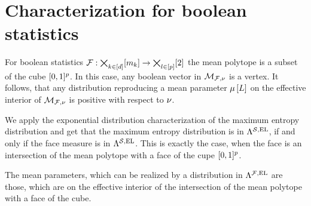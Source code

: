 \documentclass[aps,onecolumn,nofootinbib,pra]{article}
\begin{document}
    \section{Characterization for boolean statistics}

    For boolean statistics $\mathcal{F}:\bigtimes_{k\in[d]}[m_{k}]\rightarrow\bigtimes_{l\in[p]}[2]$ the mean polytope is a subset of the cube $[0,1]^p$.
    In this case, any boolean vector in $\mathcal{M}_{\mathcal{F},\nu}$ is a vertex.
    It follows, that any distribution reproducing a mean parameter $\mu\left[L\right]$ on the effective interior of $\mathcal{M}_{\mathcal{F},\nu}$ is positive with respect to $\nu$.

    We apply the exponential distribution characterization of the maximum entropy distribution and get that the maximum entropy distribution is in $\Lambda^{\mathcal{S},\mathrm{EL}}$, if and only if the face measure is in $\Lambda^{\mathcal{S},\mathrm{EL}}$.
    This is exactly the case, when the face is an intersection of the mean polytope with a face of the cupe $[0,1]^p$.

    The mean parameters, which can be realized by a distribution in $\Lambda^{\mathcal{F},\mathrm{EL}}$ are those, which are on the effective interior of the intersection of the mean polytope with a face of the cube.
\end{document}
